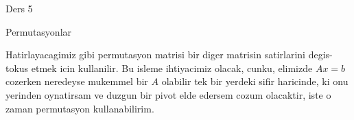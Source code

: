\documentclass[12pt,fleqn]{article}\usepackage{../common}
\begin{document}
Ders 5

Permutasyonlar

Hatirlayacagimiz gibi permutasyon matrisi bir diger matrisin satirlarini
degis-tokus etmek icin kullanilir. Bu isleme ihtiyacimiz olacak, cunku,
elimizde $Ax=b$ cozerken neredeyse mukemmel bir $A$ olabilir tek bir
yerdeki sifir haricinde, ki onu yerinden oynatirsam ve duzgun bir pivot
elde edersem cozum olacaktir, iste o zaman permutasyon kullanabilirim.
\end{document}
